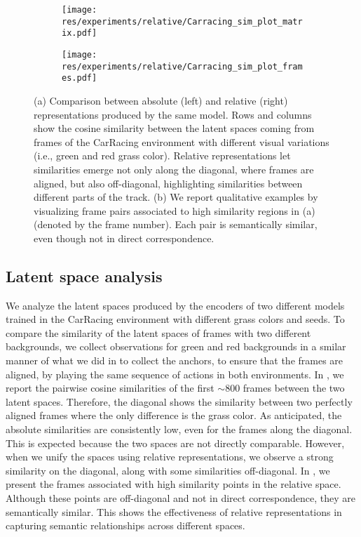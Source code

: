 \begin{figure}[t!]
    \centering
    \begin{subfigure}[b]{0.6\linewidth}
        \centering
        \texttt{[image: res/experiments/relative/Carracing\_sim\_plot\_matrix.pdf]}
        \caption{}
        \label{fig:matrix-sim}
    \end{subfigure}%
    \begin{subfigure}[b]{0.4\linewidth}
        \centering
        \texttt{[image: res/experiments/relative/Carracing\_sim\_plot\_frames.pdf]}
        \caption{}
        \label{fig:frames-sim}
    \end{subfigure}
    \caption{(a) Comparison between absolute (left) and relative (right) representations produced by the same model. Rows and columns show the cosine similarity between the latent spaces coming from frames of the CarRacing environment with different visual variations (i.e., green and red grass color). Relative representations let similarities emerge not only along the diagonal, where frames are aligned, but also off-diagonal, highlighting similarities between different parts of the track.
    (b) We report qualitative examples by visualizing frame pairs associated to high similarity regions in (a) (denoted by the frame number). Each pair is semantically similar, even though not in direct correspondence.}
    \label{fig:matrix-frames-sim}
\end{figure}

\subsection{Latent space analysis}\label{sec:exp-analysis}
We analyze the latent spaces  produced by the encoders of two different models trained in the CarRacing environment with different grass colors and seeds. 
To compare the similarity of the latent spaces of frames with two different backgrounds, we collect observations for green and red backgrounds in a smilar manner of what we did in  to collect the anchors, to ensure that the frames are aligned, by playing the same sequence of actions in both environments.
%
In , we report the pairwise cosine similarities of the first $\sim 800$ frames between the two latent spaces. Therefore, the diagonal shows the similarity between two perfectly aligned frames where the only difference is the grass color. 
%
As anticipated, the absolute similarities are consistently low, even for the frames along the diagonal. This is expected because the two spaces are not directly comparable. However, when we unify the spaces using relative representations, we observe a strong similarity on the diagonal, along with some similarities off-diagonal. In , we present the frames associated with high similarity points in the relative space. Although these points are off-diagonal and not in direct correspondence, they are semantically similar. This shows the effectiveness of relative representations in capturing semantic relationships across different spaces.

